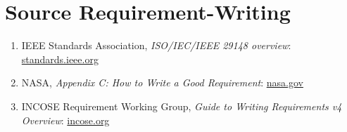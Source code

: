 \documentclass[11pt,a4paper]{article}
\begin{document}
\section*{Source Requirement-Writing}
\begin{enumerate}[leftmargin=1.5em]
	\item IEEE Standards Association, \emph{ISO/IEC/IEEE 29148 overview}: \href{https://standards.ieee.org/ieee/802.1Q/6937/}{standards.ieee.org}
	\item NASA, \emph{Appendix C: How to Write a Good Requirement}: \href{https://www.nasa.gov/reference/appendix-c-how-to-write-a-good-requirement/}{nasa.gov}
	\item INCOSE Requirement Working Group, \emph{Guide to Writing Requirements v4 Overview}: \href{https://www.incose.org/docs/default-source/working-groups/requirements-wg/shared_gtwr/gtwrv4overview120923a.pdf}{incose.org}
\end{enumerate}
\end{document}
